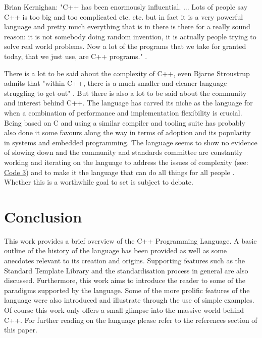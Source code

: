 \documentclass[conference, a4paper]{IEEEtran}
\begin{document}
Brian Kernighan:
"C++ has been enormously influential. ... Lots of people say C++ is too big and too complicated etc. etc. but in fact it is a very powerful language and pretty much everything that is in there is there for a really sound reason: it is not somebody doing random invention, it is actually people trying to solve real world problems. Now a lot of the programs that we take for granted today, that we just use, are C++ programs." \cite{bkcomputerphile}.

There is a lot to be said about the complexity of C++, even Bjarne Stroustrup admits that "within C++, there is a much smaller and cleaner language struggling to get out" \cite{cppquotes}. But there is also a lot to be said about the community and interest behind C++. The language has carved its niche as the language for when a combination of performance and implementation flexibility is crucial. Being based on C and using a similar compiler and tooling suite has probably also done it some favours along the way in terms of adoption and its popularity in systems and embedded programming. The language seems to show no evidence of slowing down and the community and standards committee are constantly working and iterating on the language to address the issues of complexity (see: \hyperref[listing:3]{Code 3}) and to make it the language that can do all things for all people . Whether this is a worthwhile goal to set is subject to debate. 

\section{Conclusion}

This work provides a brief overview of the C++ Programming Language. A basic outline of the history of the language has been provided as well as some anecdotes relevant to its creation and origins. Supporting features such as the Standard Template Library and the standardisation process in general are also discussed. Furthermore, this work aims to introduce the reader to some of the paradigms supported by the language. Some of the more prolific features of the language were also introduced and illustrate through the use of simple examples. Of course this work only offers a small glimpse into the massive world behind C++. For further reading on the language please refer to the references section of this paper.




\phantom{\cite{*}}

\end{document}
